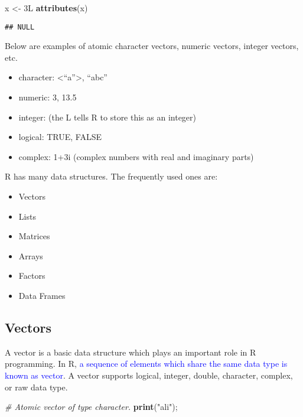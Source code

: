 \documentclass[
]{article}
\newenvironment{Shaded}{\begin{snugshade}}{\end{snugshade}}
\newcommand{\CommentTok}[1]{\textcolor[rgb]{0.56,0.35,0.01}{\textit{#1}}}
\newcommand{\FunctionTok}[1]{\textcolor[rgb]{0.13,0.29,0.53}{\textbf{#1}}}
\newcommand{\NormalTok}[1]{#1}
\newcommand{\OtherTok}[1]{\textcolor[rgb]{0.56,0.35,0.01}{#1}}
\newcommand{\StringTok}[1]{\textcolor[rgb]{0.31,0.60,0.02}{#1}}
\providecommand{\tightlist}{%
  \setlength{\itemsep}{0pt}\setlength{\parskip}{0pt}}
\begin{document}
\begin{Shaded}
\begin{Highlighting}[]
\NormalTok{x }\OtherTok{\textless{}{-}}\NormalTok{ 3L}
\FunctionTok{attributes}\NormalTok{(x)}
\end{Highlighting}
\end{Shaded}

\begin{verbatim}
## NULL
\end{verbatim}

Below are examples of atomic character vectors, numeric vectors, integer
vectors, etc.

\begin{itemize}
\item
  character: \textless{}``a''\textgreater, ``abc''
\item
  numeric: 3, 13.5
\item
  integer: (the L tells R to store this as an integer)
\item
  logical: TRUE, FALSE
\item
  complex: 1+3i (complex numbers with real and imaginary parts)
\end{itemize}

R has many data structures. The frequently used ones are:

\begin{itemize}
\tightlist
\item
  Vectors
\item
  Lists
\item
  Matrices
\item
  Arrays
\item
  Factors
\item
  Data Frames
\end{itemize}

\hypertarget{vectors}{%
\subsection{Vectors}\label{vectors}}

A vector is a basic data structure which plays an important role in R
programming. In R,
\textcolor{blue}{a sequence of elements which share the same data type is known as vector}.
A vector supports logical, integer, double, character, complex, or raw
data type.

\begin{Shaded}
\begin{Highlighting}[]
\CommentTok{\# Atomic vector of type character.}
\FunctionTok{print}\NormalTok{(}\StringTok{"ali"}\NormalTok{);}
\end{Highlighting}
\end{Shaded}
\end{document}
